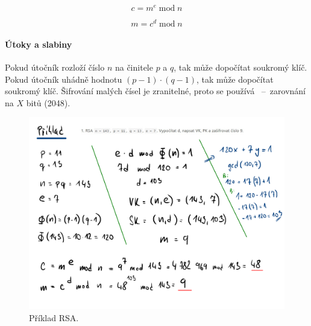 \begin{equation}
    c = m^e \; \text{mod} \; n
\end{equation}

\begin{equation}
    m = c^d \; \text{mod} \; n
\end{equation}

\paragraph*{Útoky a slabiny} Pokud útočník rozloží číslo $n$ na činitele $p$ a $q$, tak může dopočítat soukromý klíč. Pokud útočník uhádně hodnotu $(p-1) \cdot (q-1)$, tak může dopočítat soukromý klíč. Šifrování malých čísel je zranitelné, proto se používá ~--~zarovnání na $X$ bitů (2048).

\begin{figure}[H]
    \centering
    \includegraphics[width=1\linewidth]{rsa_example.pdf}
    \caption{Příklad RSA.}
\end{figure}
